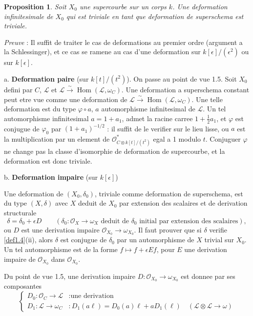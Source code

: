 \documentclass[11pt,a4paper]{article}
\theoremstyle{plain}
\newtheorem{proposition}[theorem]{Proposition}
\theoremstyle{definition}
\DeclareMathOperator{\Hom}{Hom}
\begin{document}
\begin{proposition}\label{prop1.7}
Soit $X_0$ une supercourbe sur un corps $k$. Une deformation infinitesimale de $X_0$ qui est triviale en tant que deformation de superschema est triviale.
\end{proposition}

\noindent \textit{Preuve} : Il suffit de traiter le cas de deformations au premier ordre (argument a la Schlessinger), et ce cas se ramene au cas d'une deformation sur $k[\epsilon]/(\epsilon^2)$ ou sur $k[\epsilon]$.

\medskip

\noindent a. \textbf{Deformation paire} (sur $k[t]/(t^2)$). On passe au point de vue 1.5. Soit $X_0$ defini par $C$, $\mathcal{L}$ et $\mathcal{L} \xrightarrow{\sim} \Hom(\mathcal{L},\omega_C)$. Une deformation a superschema constant peut etre vue comme une deformation de $\mathcal{L} \xrightarrow{\sim} \Hom(\mathcal{L},\omega_C)$. Une telle deformation est du type $\varphi \circ a$, $a$ automorphisme infinitesimal de $\mathcal{L}$. Un tel automorphisme infinitesimal $a = 1 + a_1$, admet la racine carree $1 + \frac{1}{2}a_1$, et $\varphi$ est conjugue de $\varphi_0$ par $(1+a_1)^{-1/2}$ : il suffit de le verifier sur le lieu lisse, ou $a$ est la multiplication par un element de $\mathcal{O}_{C \otimes k[t]/(t^2)}^*$ egal a 1 modulo $t$. Conjuguer $\varphi$ ne change pas la classe d'isomorphie de deformation de supercourbe, et la deformation est donc triviale.

\newpage

\noindent b. \textbf{Deformation impaire} (sur $k[\epsilon]$)

Une deformation de $(X_0, \delta_0)$, triviale comme deformation de superschema, est du type $(X,\delta)$ avec $X$ deduit de $X_0$ par extension des scalaires et de derivation structurale
\[
\delta = \delta_0 + \epsilon D \qquad (\delta_0 : \mathcal{O}_X \to \omega_X \text{ deduit de } \delta_0 \text{ initial par extension des scalaires}),
\]
ou $D$ est une derivation impaire $\mathcal{O}_{X_0} \to \omega_{X_0}$. Il faut prouver que si $\delta$ verifie \ref{def1.4}(ii), alors $\delta$ est conjugue de $\delta_0$ par un automorphisme de $X$ trivial sur $X_0$. Un tel automorphisme est de la forme $f \mapsto f + \epsilon Ef$, pour $E$ une derivation impaire de $\mathcal{O}_{X_0}$ dans $\mathcal{O}_{X_0}$.

Du point de vue 1.5, une derivation impaire $D : \mathcal{O}_{X_0} \to \omega_{X_0}$ est donnee par ses composantes
\[
\begin{cases}
D_0 : \mathcal{O}_C \to \mathcal{L} & : \text{une derivation} \\
D_1 : \mathcal{L} \to \omega_C & : D_1(a\ell) = D_0(a)\ell + aD_1(\ell) \quad (\mathcal{L} \otimes \mathcal{L} \to \omega)
\end{cases}
\]
\end{document}
